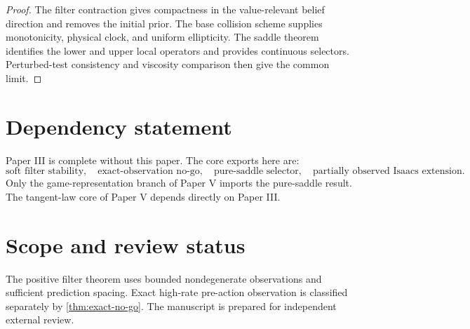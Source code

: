 \documentclass[11pt,reqno]{amsart}
\theoremstyle{definition}
\theoremstyle{remark}
\begin{document}
\begin{proof}
The filter contraction gives compactness in the value-relevant belief
direction and removes the initial prior.  The base collision scheme supplies
monotonicity, physical clock, and uniform ellipticity.  The saddle theorem
identifies the lower and upper local operators and provides continuous
selectors.  Perturbed-test consistency and viscosity comparison then give the
common limit.
\end{proof}

\section{Dependency statement}

Paper III is complete without this paper.  The core exports here are:
\[
 \text{soft filter stability},\quad
 \text{exact-observation no-go},\quad
 \text{pure-saddle selector},\quad
 \text{partially observed Isaacs extension}.
\]
Only the game-representation branch of Paper V imports the pure-saddle result.
The tangent-law core of Paper V depends directly on Paper III.

\section*{Scope and review status}

The positive filter theorem uses bounded nondegenerate observations and
sufficient prediction spacing.  Exact high-rate pre-action observation is
classified separately by \cref{thm:exact-no-go}.  The manuscript is prepared
for independent external review.



\end{document}

